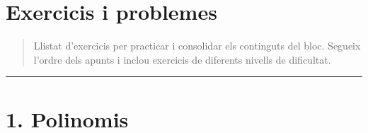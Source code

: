\documentclass[13pt,a4paper]{extarticle}
\begin{document}
\section*{Exercicis i problemes}

\begin{quote}\small Llistat d'exercicis per practicar i consolidar els continguts del bloc. Segueix l'ordre dels apunts i inclou exercicis de diferents nivells de dificultat.\end{quote}


\vspace{1mm}\hrule\vspace{3mm}


\section*{1. Polinomis}
\end{document}
